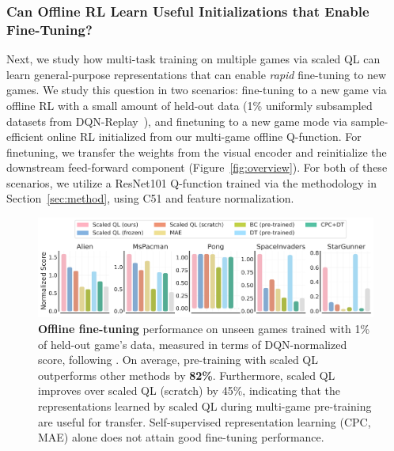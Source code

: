 \vspace{-0.2cm}
\subsubsection{Can Offline RL Learn Useful Initializations that Enable Fine-Tuning?}
\label{sec:ft_off_on}
\vspace{-0.2cm}

Next, we study how multi-task training on multiple games via scaled QL can learn general-purpose representations that can enable \emph{rapid} fine-tuning to new games. We study this question in two scenarios: fine-tuning to a new game via offline RL with a small amount of held-out data (1\% uniformly subsampled datasets from DQN-Replay~\citep{agarwal2019optimistic}), and finetuning to a new game mode via sample-efficient online RL initialized from our multi-game offline Q-function. For finetuning, we transfer the weights from the visual encoder and reinitialize the downstream feed-forward component (Figure~\ref{fig:overview}). For both of these scenarios, we utilize a ResNet101 Q-function trained via the methodology in Section~\ref{sec:method}, using C51 and feature normalization.

\begin{figure}[t]
    \centering
    \includegraphics[width=0.99\linewidth]{chapters/scaled_ql/figures/offline_ft.pdf}
    \vspace{-0.25cm}
    \caption{\footnotesize{\textbf{Offline fine-tuning} performance on unseen games trained with 1\% of held-out game's data, measured in terms of DQN-normalized score, following \citep{lee2022multi}. On average, pre-training with scaled QL outperforms other methods by \textbf{82\%}. Furthermore, scaled QL improves over scaled QL (scratch) by 45\%, indicating that the representations learned by scaled QL during multi-game pre-training are useful for transfer. Self-supervised representation learning (CPC, MAE) alone does not attain good fine-tuning performance.}}
    \label{fig:offline_ft}
    \vspace{-0.3cm}
\end{figure}


